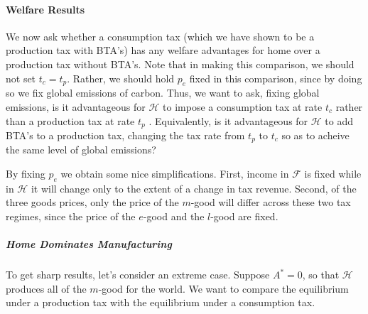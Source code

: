 \documentclass[notitlepage,12pt]{article}
\begin{document}
\paragraph{Welfare Results}

We now ask whether a consumption tax (which we have shown to be a production
tax with BTA's) has any welfare advantages for home over a production tax
without BTA's. Note that in making this comparison, we should not set $%
t_{c}=t_{p}$. Rather, we should hold $p_{e}$ fixed in this comparison, since
by doing so we fix global emissions of carbon. Thus, we want to ask, fixing
global emissions, is it advantageous for $\mathcal{H}$ to impose a
consumption tax at rate $t_{c}$ rather than a production tax at rate $t_{p}$%
. Equivalently, is it advantageous for $\mathcal{H}$ to add BTA's to a
production tax, changing the tax rate from $t_{p}$ to $t_{c}$ so as to
acheive the same level of global emissions?

By fixing $p_{e}$ we obtain some nice simplifications. First, income in $%
\mathcal{F}$ is fixed while in $\mathcal{H}$ it will change only to the
extent of a change in tax revenue. Second, of the three goods prices, only
the price of the $m$-good will differ across these two tax regimes, since
the price of the $e$-good and the $l$-good are fixed.

\subparagraph{Home Dominates Manufacturing}

To get sharp results, let's consider an extreme case. Suppose $A^{\ast }=0$,
so that $\mathcal{H}$ produces all of the $m$-good for the world. We want to
compare the equilibrium under a production tax with the equilibrium under a
consumption tax.
\end{document}
